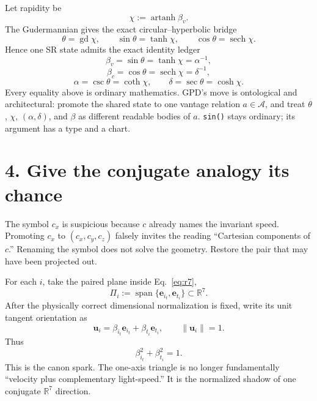 \documentclass[8pt,twocolumn]{extarticle}
\DeclareMathOperator{\sech}{sech}
\DeclareMathOperator{\gd}{gd}
\DeclareMathOperator{\artanh}{artanh}
\newcommand{\R}{\mathbb{R}}
\newcommand{\Aspace}{\mathcal{A}}
\newcommand{\evec}[1]{\mathbf e_{#1}}
\newcommand{\uvect}[1]{\mathbf u_{#1}}
\begin{document}
Let rapidity be
\begin{equation}
\chi:=\artanh\beta_v.
\end{equation}
The Gudermannian gives the exact circular--hyperbolic bridge
\begin{equation}
\theta=\gd\chi,
\qquad
\sin\theta=\tanh\chi,
\qquad
\cos\theta=\sech\chi.
\label{eq:gd}
\end{equation}
Hence one SR state admits the exact identity ledger
\begin{equation}
\boxed{
\beta_v
=\sin\theta
=\tanh\chi
=\alpha^{-1},
}
\label{eq:master1}
\end{equation}
\begin{equation}
\boxed{
\beta_c
=\cos\theta
=\sech\chi
=\delta^{-1},
}
\label{eq:master2}
\end{equation}
\begin{equation}
\boxed{
\alpha=\csc\theta=\coth\chi,
\qquad
\delta=\sec\theta=\cosh\chi.
}
\label{eq:master3}
\end{equation}
Every equality above is ordinary mathematics. GPD's move is ontological and
architectural: promote the shared state to one vantage relation
$a\in\Aspace$, and treat $\theta$, $\chi$, $(\alpha,\delta)$, and $\beta$ as
different readable bodies of $a$. \texttt{sin()} stays ordinary; its argument
has a type and a chart.

\section*{4. Give the conjugate analogy its chance}

The symbol $c_x$ is suspicious because $c$ already names the invariant speed.
Promoting $c_x$ to $(c_x,c_y,c_z)$ falsely invites the reading ``Cartesian
components of $c$.'' Renaming the symbol does not solve the geometry.
Restore the pair that may have been projected out.

For each $i$, take the paired plane inside Eq.~\eqref{eq:r7},
\begin{equation}
\Pi_i:=\operatorname{span}\{\evec{i_t},\evec{t_i}\}\subset\R^7.
\end{equation}
After the physically correct dimensional normalization is fixed, write its
unit tangent orientation as
\begin{equation}
\boxed{
\uvect{i}
=
\beta_{i_t}\evec{i_t}
+
\beta_{t_i}\evec{t_i},
\qquad
\|\uvect{i}\|=1.
}
\label{eq:unitpair}
\end{equation}
Thus
\begin{equation}
\boxed{
\beta_{i_t}^2+\beta_{t_i}^2=1.
}
\label{eq:paircircle}
\end{equation}
This is the canon spark. The one-axis triangle is no longer fundamentally
``velocity plus complementary light-speed.'' It is the normalized shadow of
one conjugate $\R^7$ direction.
\end{document}
